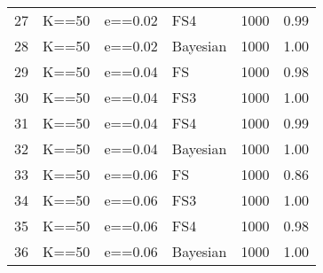 \begin{table}[ht]
\begin{tabular}{rlllrr}
  27 & K==50 & e==0.02 & FS4 & 1000 & 0.99 \\ 
  28 & K==50 & e==0.02 & Bayesian & 1000 & 1.00 \\ 
  29 & K==50 & e==0.04 & FS & 1000 & 0.98 \\ 
  30 & K==50 & e==0.04 & FS3 & 1000 & 1.00 \\ 
  31 & K==50 & e==0.04 & FS4 & 1000 & 0.99 \\ 
  32 & K==50 & e==0.04 & Bayesian & 1000 & 1.00 \\ 
  33 & K==50 & e==0.06 & FS & 1000 & 0.86 \\ 
  34 & K==50 & e==0.06 & FS3 & 1000 & 1.00 \\ 
  35 & K==50 & e==0.06 & FS4 & 1000 & 0.98 \\ 
  36 & K==50 & e==0.06 & Bayesian & 1000 & 1.00 \\ 
   \hline
\end{tabular}
\end{table}
